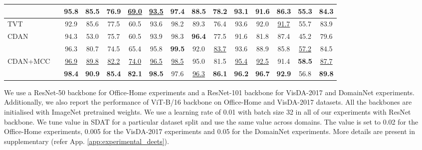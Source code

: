 \documentclass[table,dvipsnames]{article}
\theoremstyle{plain}
\theoremstyle{definition}
\theoremstyle{remark}
\begin{document}
\begin{table*}[ht!]
\begin{adjustbox}{max width=\textwidth}
\begin{tabular}{l|c|cccccccccccc|c}
		\cellcolor{mygray}{CDAN+MCC w/ SDAT} &&   \cellcolor{mygray}\textbf{95.8} & \cellcolor{mygray}\textbf{85.5} & \cellcolor{mygray}76.9 &\cellcolor{mygray}\underline{69.0} & \cellcolor{mygray}\underline{93.5} & \cellcolor{mygray}\textbf{97.4} & \cellcolor{mygray}88.5 & \cellcolor{mygray}78.2 & \cellcolor{mygray}\textbf{93.1} & \cellcolor{mygray}\textbf{91.6} & \cellcolor{mygray}86.3 & \cellcolor{mygray}\textbf{55.3} & \cellcolor{mygray}\textbf{84.3}\\ \hline\hline
TVT \cite{yang2021tvt} &\parbox[t]{2mm}{} & 92.9 & 85.6 & 77.5 & 60.5 & 93.6 & 98.2 & 89.3 & 76.4 & 93.6 & 92.0 & \underline{91.7} & 55.7 & 83.9 \\
		{CDAN} & & 94.3 & 53.0 & 75.7 & 60.5 & 93.9 & 98.3 & \textbf{96.4} & 77.5 & 91.6 & 81.8 & 87.4 & 45.2 & 79.6\\
		 & &  96.3 & 80.7 & 74.5 & 65.4 & 95.8 & \textbf{99.5} & 92.0 & \underline{83.7} & 93.6 & 88.9 & 85.8 & \underline{57.2} & 84.5\\
		{CDAN+MCC} &&   \underline{96.9} & \underline{89.8} & \underline{82.2} & \underline{74.0} & \underline{96.5} & \underline{98.5} & 95.0 & 81.5 & \underline{95.4}& \underline{92.5} & 91.4 & \textbf{58.5} & \underline{87.7}\\
		 && \textbf{98.4} & \textbf{90.9} & \textbf{85.4} & \textbf{82.1} & \textbf{98.5} & 97.6 & \underline{96.3} & \textbf{86.1} & \textbf{96.2} & \textbf{96.7} & \textbf{92.9} & 56.8 & \textbf{89.8} \\ 
		\hline
		
\end{tabular}\end{adjustbox}
\end{table*}

We use a ResNet-50 backbone for Office-Home experiments and a ResNet-101 backbone for VisDA-2017 and DomainNet experiments. Additionally, we also report the performance of ViT-B/16 \cite{dosovitskiy2020image} backbone on Office-Home and VisDA-2017 datasets. All the backbones are initialised with ImageNet pretrained weights. We use a learning rate of 0.01 with batch size 32 in all of our experiments with ResNet backbone. We tune  value in SDAT for a particular dataset split and use the same value across domains. The  value is set to 0.02 for the Office-Home experiments, 0.005 for the VisDA-2017 experiments and 0.05 for the DomainNet experiments. More details are present in supplementary (refer App. \ref{app:experimental_deets}).
\end{document}
